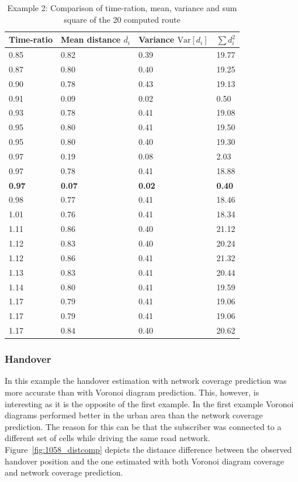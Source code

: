 \begin{table}
\centering
\begin{tabular}{l|l|l|l}
Time-ratio & Mean distance $\overline{d_i}$ & Variance $\mathrm{Var}[d_i]$& $\sum {d}_{i}^{2}$ \\
\hline
0.85 & 0.82 & 0.39 & 19.77 \\
0.87 & 0.80 & 0.40 & 19.25 \\
0.90 & 0.78 & 0.43 & 19.13 \\
0.91 & 0.09 & 0.02 & 0.50 \\
0.93 & 0.78 & 0.41 & 19.08 \\
0.95 & 0.80 & 0.41 & 19.50 \\
0.95 & 0.80 & 0.40 & 19.30 \\
0.97 & 0.19 & 0.08 & 2.03 \\
0.97 & 0.78 & 0.41 & 18.88 \\
\textbf{0.97} & \textbf{0.07} &\textbf{0.02} &\textbf{0.40} \\
0.98 & 0.77 & 0.41 & 18.46 \\
1.01 & 0.76 & 0.41 & 18.34 \\
1.11 & 0.86 & 0.40 & 21.12 \\
1.12 & 0.83 & 0.40 & 20.24 \\
1.12 & 0.86 & 0.41 & 21.32 \\
1.13 & 0.83 & 0.41 & 20.44 \\
1.14 & 0.80 & 0.41 & 19.59 \\
1.17 & 0.79 & 0.41 & 19.06 \\
1.17 & 0.79 & 0.41 & 19.06 \\
1.17 & 0.84 & 0.40 & 20.62
\end{tabular}
\caption{Example 2: Comparison of time-ration, mean, variance and sum square of the 20 computed route}
\label{tab:1058route}
\end{table}
\subsubsection{Handover}
In this example the handover estimation with network coverage prediction was more accurate than with Voronoi diagram prediction. This, however, is interesting as it is the opposite of the first example. In the first example Voronoi diagrams performed better in the urban area than the network coverage prediction. The reason for this can be that the subscriber was connected to a different set of cells while driving the same road network. Figure~\ref{fig:1058_distcomp} depicts the distance difference between the observed handover position and the one estimated with both Voronoi diagram coverage and network coverage prediction.
